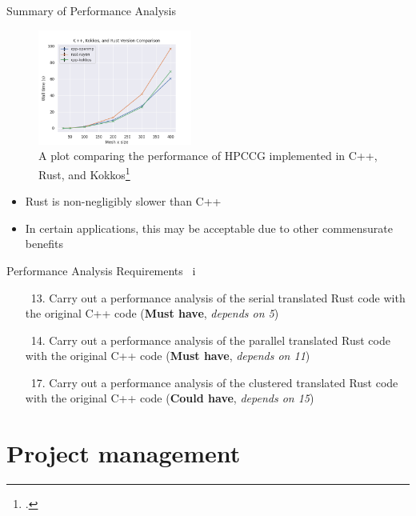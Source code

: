 \documentclass[10pt,aspectratio=169]{beamer}
\newcommand{\cmark}{\ding{51}}
\newcommand{\done}{\rlap{$\square$}{\raisebox{2pt}{\large\hspace{1pt}\textcolor{green}{\cmark}}}\hspace{-2.5pt}}
\begin{document}
\begin{frame}{Summary of Performance Analysis}
    \begin{figure}[h]
        \centering
        \includegraphics[width=0.45\textwidth]{images/performance_summary.png}
        \caption{A plot comparing the performance of HPCCG implemented in C++, Rust, and Kokkos\footcite{KokkosEcosystem}}
        \label{fig:specification_gantt_chart}
    \end{figure}
    \vspace*{-0.4cm}
    \begin{itemize}
        \item Rust is non-negligibly slower than C++
        \item In certain applications, this may be acceptable due to other commensurate benefits
    \end{itemize}
    \vspace*{0.4cm}
\end{frame}

\begin{frame}{Performance Analysis Requirements \ i}
    \begin{itemize}
        \item[\done\ 13.]
          Carry out a performance analysis of the serial translated Rust code with the original C++ code
          (\textbf{Must have}, \textit{depends on 5})
        \item[\done\ 14.]
          Carry out a performance analysis of the parallel translated Rust code with the original C++ code
          (\textbf{Must have}, \textit{depends on 11})
        \item[\done\ 17.]
          Carry out a performance analysis of the clustered translated Rust code with the original C++ code
          (\textbf{Could have}, \textit{depends on 15})
    \end{itemize}
\end{frame}






\section{Project management}
\end{document}
